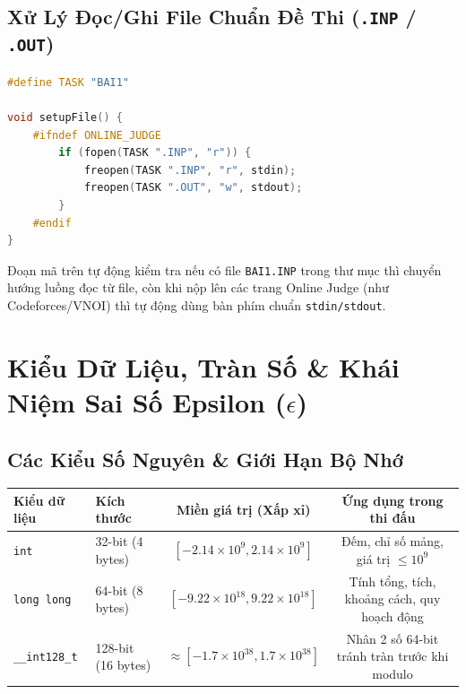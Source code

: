 \documentclass[11pt,a4paper]{article}
\begin{document}
\subsection{Xử Lý Đọc/Ghi File Chuẩn Đề Thi (\texttt{.INP} / \texttt{.OUT})}

\begin{lstlisting}[language=C++]
#define TASK "BAI1"

void setupFile() {
    #ifndef ONLINE_JUDGE
        if (fopen(TASK ".INP", "r")) {
            freopen(TASK ".INP", "r", stdin);
            freopen(TASK ".OUT", "w", stdout);
        }
    #endif
}
\end{lstlisting}
Đoạn mã trên tự động kiểm tra nếu có file \texttt{BAI1.INP} trong thư mục thì chuyển hướng luồng đọc từ file, còn khi nộp lên các trang Online Judge (như Codeforces/VNOI) thì tự động dùng bàn phím chuẩn \texttt{stdin/stdout}.

\vspace{15pt}
\section{Kiểu Dữ Liệu, Tràn Số \& Khái Niệm Sai Số Epsilon ($\epsilon$)}

\subsection{Các Kiểu Số Nguyên \& Giới Hạn Bộ Nhớ}

\begin{table}[h!]
\centering
\begin{tabular}{@{}llcc@{}}
\toprule
\textbf{Kiểu dữ liệu} & \textbf{Kích thước} & \textbf{Miền giá trị (Xấp xỉ)} & \textbf{Ứng dụng trong thi đấu} \\ \midrule
\texttt{int} & 32-bit (4 bytes) & $[-2.14 \times 10^9, 2.14 \times 10^9]$ & Đếm, chỉ số mảng, giá trị $\le 10^9$ \\
\texttt{long long} & 64-bit (8 bytes) & $[-9.22 \times 10^{18}, 9.22 \times 10^{18}]$ & Tính tổng, tích, khoảng cách, quy hoạch động \\
\texttt{\_\_int128\_t} & 128-bit (16 bytes) & $\approx [-1.7 \times 10^{38}, 1.7 \times 10^{38}]$ & Nhân 2 số 64-bit tránh tràn trước khi modulo \\ \bottomrule
\end{tabular}
\end{table}
\end{document}
